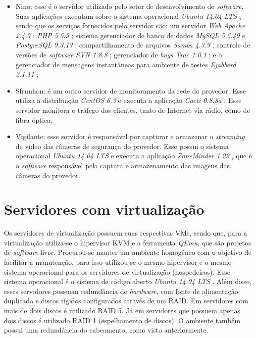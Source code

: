 \begin{itemize}
 \item Nino: esse é o servidor utilizado pelo setor de desenvolvimento de \textit{software}. Suas aplicações executam sobre o sistema operacional 
 \textit{Ubuntu 14.04 \ac{LTS}} \cite{ubuntu}, sendo que os serviços fornecidos pelo servidor são: um servidor \textit{Web} \textit{Apache 2.4.7} 
 \cite{apache}; \textit{\ac{PHP} 5.5.9} \cite{php}; sistema gerenciador de banco de dados \textit{MySQL 5.5.49} \cite{mysql} e 
 \textit{PostgreSQL 9.3.13} \cite{postgres}; compartilhamento de arquivos \textit{Samba 4.3.9} \cite{samba}; controle de versões de 
 \textit{software} \textit{\ac{SVN} 1.8.8} \cite{svn}; gerenciador de \textit{bugs} \textit{Trac 1.0.1} \cite{trac}; e o gerenciador de 
 mensagens instantâneas para ambiente de testes \textit{Ejabberd 2.1.11} \cite{ejabberd};
 
 \item Sfrunhon: é um outro servidor de monitoramento da rede do provedor. Esse utiliza a distribuição \textit{CentOS 6.3} \cite{centos} e executa 
 a aplicação \textit{Cacti 0.8.8a} \cite{cacti}. Esse servidor monitora o tráfego dos clientes, tanto de Internet via rádio, como de 
 fibra óptica;
 
 \item Vigilante: esse servidor é responsável por capturar e armazenar o \textit{streaming} de vídeo das câmeras de segurança do provedor. 
 Esse possui o sistema operacional \textit{Ubuntu 14.04 \ac{LTS}} \cite{ubuntu} e executa a aplicação \textit{ZoneMinder 1.29} \cite{zoneminder}, 
 que é o \textit{software} responsável pela captura e armazenamento das imagens das câmeras do provedor.
\end{itemize}

\section{Servidores com virtualização}
\label{section:servvirt}

Os servidores de virtualização possuem suas respectivas \ac{VM}s, sendo que, para a virtualização utiliza-se o hipervisor \ac{KVM} e a 
ferramenta \textit{QEmu}, que são projetos de \textit{software} livre. Procurou-se manter um ambiente homogêneo com o objetivo de facilitar a 
manutenção, para isso utilizou-se o mesmo hipervisor e o mesmo sistema operacional para os servidores de virtualização (hospedeiros). 
Esse sistema operacional é o sistema de código aberto \textit{Ubuntu 14.04 \ac{LTS}} \cite{ubuntu}.
Além disso, esses servidores possuem redundância de \textit{hardware}, com fonte de alimentação duplicada e discos rígidos configurados através de 
um \ac{RAID}. Em servidores com mais de dois discos é utilizado \ac{RAID} 5. Já em servidores que possuem apenas dois discos é utilizado \ac{RAID} 1 
(espelhamento de discos). O ambiente também possui uma redundância do cabeamento, como visto anteriormente.

